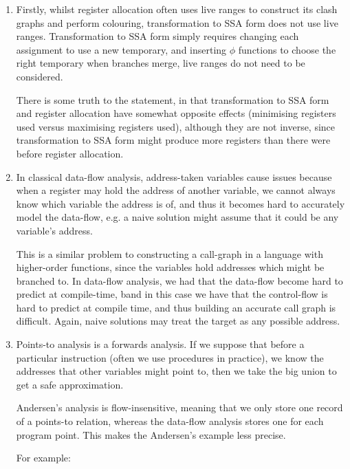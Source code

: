


\begin{enumerate}[label=(\alph*)]

    \item
        Firstly, whilst register allocation often uses live ranges to construct its clash graphs and perform colouring, transformation to SSA form does not use live ranges. Transformation to SSA form simply requires changing each assignment to use a new temporary, and inserting $\phi$ functions to choose the right temporary when branches merge, live ranges do not need to be considered.

        There is some truth to the statement, in that transformation to SSA form and register allocation have somewhat opposite effects (minimising registers used versus maximising registers used), although they are not inverse, since transformation to SSA form might produce more registers than there were before register allocation.

    \item
        In classical data-flow analysis, address-taken variables cause issues because when a register may hold the address of another variable, we cannot always know which variable the address is of, and thus it becomes hard to accurately model the data-flow, e.g. a naive solution might assume that it could be any variable's address.

        This is a similar problem to constructing a call-graph in a language with higher-order functions, since the variables hold addresses which might be branched to. In data-flow analysis, we had that the data-flow become hard to predict at compile-time, band in this case we have that the control-flow is hard to predict at compile time, and thus building an accurate call graph is difficult. Again, naive solutions may treat the target as any possible address.

    \item
        Points-to analysis is a forwards analysis. If we suppose that before a particular instruction (often we use procedures in practice), we know the addresses that other variables might point to, then we take the big union to get a safe approximation.

        Andersen's analysis is flow-insensitive, meaning that we only store one record of a points-to relation, whereas the data-flow analysis stores one for each program point. This makes the Andersen's example less precise.

        For example:


\end{enumerate}
